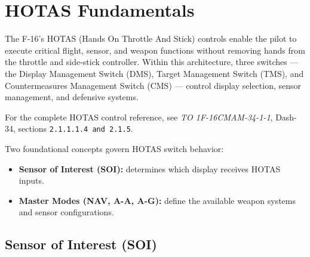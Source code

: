 \documentclass[11pt, a4paper, twoside]{report}
\newcommand{\dashrefs}[1]{\textit{TO 1F-16CMAM-34-1-1}, Dash-34, sections \texttt{#1}}
\begin{document}

\chapter{HOTAS Fundamentals}
\label{chap:C2}
The F-16’s HOTAS (Hands On Throttle And Stick) controls enable the pilot to execute critical flight, sensor, and weapon functions without removing hands from the throttle and side-stick controller. Within this architecture, three switches — the Display Management Switch (DMS), Target Management Switch (TMS), and Countermeasures Management Switch (CMS) — control display selection, sensor management, and defensive systems.

For the complete HOTAS control reference, see \dashrefs{2.1.1.1.4 and 2.1.5}.

Two foundational concepts govern HOTAS switch behavior:

\begin{itemize}
    \item \textbf{Sensor of Interest (SOI):} determines which display receives HOTAS inputs.
    \item \textbf{Master Modes (NAV, A-A, A-G):} define the available weapon systems and sensor configurations.
\end{itemize}

\section{Sensor of Interest (SOI)}
\label{sec:C2-S1}
\end{document}
